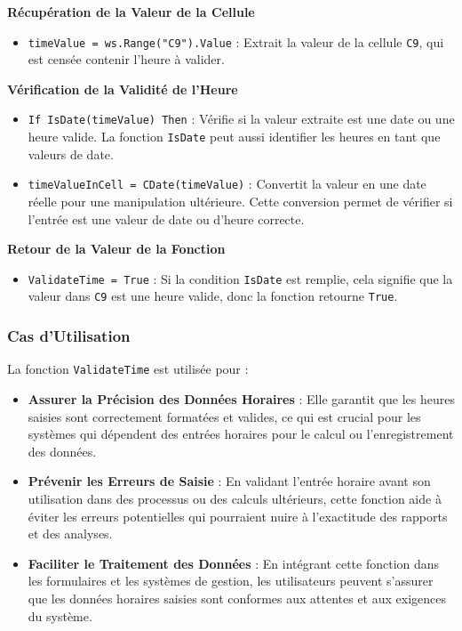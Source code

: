 \documentclass[a4paper, oneside, 12pt, final]{extreport}
\begin{document}
\textbf{Récupération de la Valeur de la Cellule}

\begin{itemize}
    \item \texttt{timeValue = ws.Range("C9").Value} : Extrait la valeur de la cellule \texttt{C9}, qui est censée contenir l'heure à valider.
\end{itemize}

\textbf{Vérification de la Validité de l'Heure}

\begin{itemize}
    \item \texttt{If IsDate(timeValue) Then} : Vérifie si la valeur extraite est une date ou une heure valide. La fonction \texttt{IsDate} peut aussi identifier les heures en tant que valeurs de date.
    \item \texttt{timeValueInCell = CDate(timeValue)} : Convertit la valeur en une date réelle pour une manipulation ultérieure. Cette conversion permet de vérifier si l'entrée est une valeur de date ou d'heure correcte.
\end{itemize}

\textbf{Retour de la Valeur de la Fonction}

\begin{itemize}
    \item \texttt{ValidateTime = True} : Si la condition \texttt{IsDate} est remplie, cela signifie que la valeur dans \texttt{C9} est une heure valide, donc la fonction retourne \texttt{True}.
\end{itemize}

\subsubsection{Cas d'Utilisation}

La fonction \texttt{ValidateTime} est utilisée pour :

\begin{itemize}
    \item \textbf{Assurer la Précision des Données Horaires} : Elle garantit que les heures saisies sont correctement formatées et valides, ce qui est crucial pour les systèmes qui dépendent des entrées horaires pour le calcul ou l'enregistrement des données.
    \item \textbf{Prévenir les Erreurs de Saisie} : En validant l'entrée horaire avant son utilisation dans des processus ou des calculs ultérieurs, cette fonction aide à éviter les erreurs potentielles qui pourraient nuire à l'exactitude des rapports et des analyses.
    \item \textbf{Faciliter le Traitement des Données} : En intégrant cette fonction dans les formulaires et les systèmes de gestion, les utilisateurs peuvent s'assurer que les données horaires saisies sont conformes aux attentes et aux exigences du système.
\end{itemize}
\end{document}
